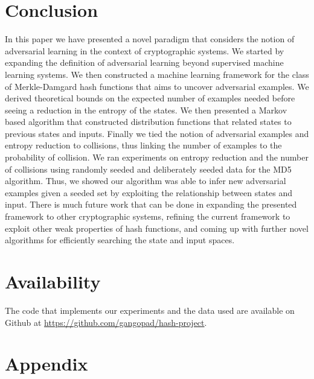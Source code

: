 \documentclass[letterpaper,twocolumn,10pt]{article}
\begin{document}
\section*{Conclusion}
In this paper we have presented a novel paradigm that considers the notion of adversarial learning in the context of cryptographic systems. We started by expanding the definition of adversarial learning beyond supervised machine learning systems. We then constructed a machine learning framework for the class of Merkle-Damgard hash functions that aims to uncover adversarial examples. We derived theoretical bounds on the expected number of examples needed before seeing a reduction in the entropy of the states. We then presented a Markov based algorithm that constructed distribution functions that related states to previous states and inputs. Finally we tied the notion of adversarial examples and entropy reduction to collisions, thus linking the number of examples to the probability of collision. We ran experiments on entropy reduction and the number of collisions using randomly seeded and deliberately seeded data for the MD5 algorithm. Thus, we showed our algorithm was able to infer new adversarial examples given a seeded set by exploiting the relationship between states and input. There is much future work that can be done in expanding the presented framework to other cryptographic systems, refining the current framework to exploit other weak properties of hash functions, and coming up with further novel algorithms for efficiently searching the state and input spaces. 


\section*{Availability}

The code that implements our experiments and the data used are available on Github at \url{https://github.com/gangopad/hash-project}. 

\section*{Appendix}
\end{document}
